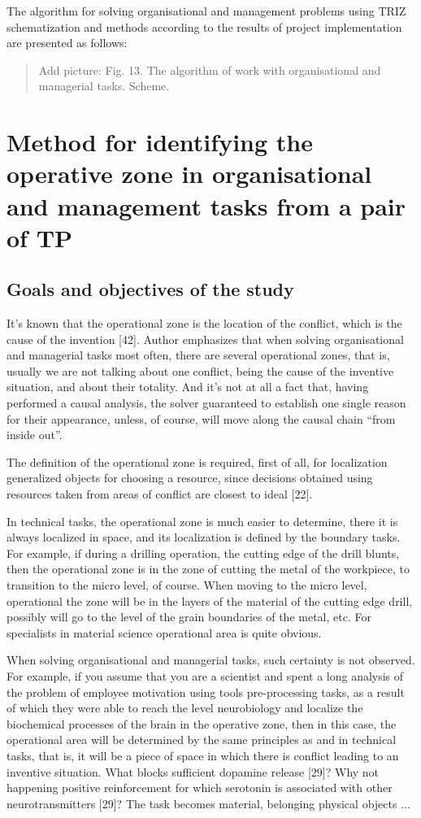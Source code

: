 \documentclass[11pt,a4paper]{book}
\newcommand{\addpicture}[1]{
  \begin{quote} Add picture: #1\end{quote}
}
\begin{document}
The algorithm for solving organisational and management problems using TRIZ
schematization and methods according to the results of project implementation
are presented as follows:

\addpicture{Fig. 13. The algorithm of work with organisational and managerial
  tasks. Scheme.}

\chapter[Identifying the operative zone]{Method for identifying the operative
  zone in organisational and management tasks from a pair of TP}

\section{Goals and objectives of the study}

It’s known that the operational zone is the location of the conflict, which is
the cause of the invention [42]. Author emphasizes that when solving
organisational and managerial tasks most often, there are several operational
zones, that is, usually we are not talking about one conflict, being the cause
of the inventive situation, and about their totality. And it’s not at all a
fact that, having performed a causal analysis, the solver guaranteed to
establish one single reason for their appearance, unless, of course, will move
along the causal chain “from inside out”.

The definition of the operational zone is required, first of all, for
localization generalized objects for choosing a resource, since decisions obtained using
resources taken from areas of conflict are closest to ideal [22].

In technical tasks, the operational zone is much easier to determine, there it
is always localized in space, and its localization is defined by the boundary
tasks. For example, if during a drilling operation, the cutting edge of the
drill blunts, then the operational zone is in the zone of cutting the metal of
the workpiece, to transition to the micro level, of course. When moving to the
micro level, operational the zone will be in the layers of the material of the
cutting edge drill, possibly will go to the level of the grain boundaries of
the metal, etc. For specialists in material science operational area is quite
obvious.

When solving organisational and managerial tasks, such certainty is not
observed. For example, if you assume that you are a scientist and spent a long
analysis of the problem of employee motivation using tools pre-processing
tasks, as a result of which they were able to reach the level neurobiology and
localize the biochemical processes of the brain in the operative zone, then in
this case, the operational area will be determined by the same principles as
and in technical tasks, that is, it will be a piece of space in which there is
conflict leading to an inventive situation. What blocks sufficient dopamine
release [29]? Why not happening positive reinforcement for which serotonin is
associated with other neurotransmitters [29]? The task becomes material,
belonging physical objects ...
\end{document}
